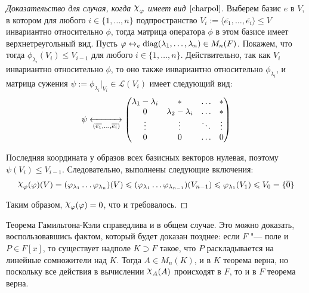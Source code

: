 \begin{proof}[Доказательство для случая, когда $\Chi_\phi$ имеет вид $\eqref*{charpol}$]
	Выберем базис $e$ в $V$, в котором для любого $i \in \{1, \dots, n\}$ подпространство $V_i := \langle\overline{e_1}, \dots, \overline{e_i}\rangle \le V$ инвариантно относительно $\phi$, тогда матрица оператора $\phi$ в этом базисе имеет верхнетреугольный вид. Пусть $\varphi \leftrightarrow_e \operatorname{diag}(\lambda_1, \dotsc, \lambda_n) \in M_n(F)$. Покажем, что тогда $\phi_{\lambda_i}(V_i) \le V_{i - 1}$ для любого $i \in \{1, \dots, n\}$. Действительно, так как $V_i$ инвариантно относительно $\phi$, то оно также инвариантно относительно $\phi_{\lambda_i}$, и матрица сужения $\psi := \phi_{\lambda_i}|_{V_i} \in \mathcal{L}(V_i)$ имеет следующий вид:
	\[\psi \xleftrightarrow[(\overline{e_1}, \dots, \overline{e_i})]{} \begin{pmatrix}
		\lambda_1 - \lambda_i & * & \dots & *\\
		0 & \lambda_2 - \lambda _i & \dots & *\\
		\vdots & \vdots & \ddots & \vdots\\
		0 & 0 & \dots & 0
	\end{pmatrix}
	\]
	
	Последняя координата у образов всех базисных векторов нулевая, поэтому $\psi(V_i) \le V_{i - 1}$. Следовательно, выполнены следующие включения:
	\[\Chi_\phi(\phi)(V) = (\phi_{\lambda_1}\dots\phi_{\lambda_n})(V) \le (\phi_{\lambda_1}\dots\phi_{\lambda_{n - 1}})(V_{n - 1}) \le \phi_{\lambda_1}(V_1) \le V_0 = \{\overline{0}\}\]
	
	Таким образом, $\Chi_\phi(\phi) = 0$, что и требовалось.
\end{proof}

\begin{note}
	Теорема Гамильтона-Кэли справедлива и в общем случае. Это можно доказать, воспользовавшись фактом, который будет доказан позднее: если $F$ "--- поле и $P \in F[x]$, то существует надполе $K \supset F$ такое, что $P$ раскладывается на линейные сомножители над $K$. Тогда $A \in M_n(K)$, и в $K$ теорема верна, но поскольку все действия в вычислении $\Chi_A(A)$ происходят в $F$, то и в $F$ теорема верна.
\end{note}